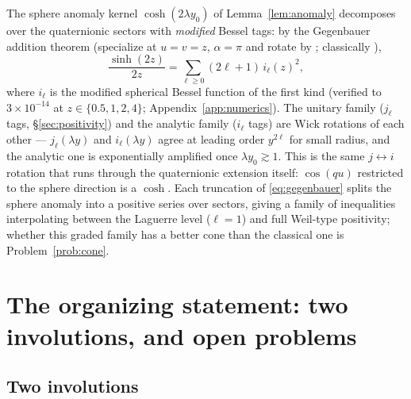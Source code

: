 \documentclass[11pt]{amsart}
\theoremstyle{plain}
\theoremstyle{definition}
\theoremstyle{remark}
\begin{document}
The sphere anomaly kernel $\cosh(2\lambda y_0)$ of Lemma~\ref{lem:anomaly} decomposes over the
quaternionic sectors with \emph{modified} Bessel tags: by the Gegenbauer addition theorem
(specialize \cite[10.60.2]{DLMF} at $u=v=z$, $\alpha=\pi$ and rotate by
\cite[10.47.12]{DLMF}; classically \cite[\S11.4]{Watson1944}),
\begin{equation}\label{eq:gegenbauer}
\frac{\sinh(2z)}{2z}=\sum_{\ell\ge0}(2\ell+1)\,i_\ell(z)^2 ,
\end{equation}
where $i_\ell$ is the modified spherical Bessel function of the first kind (verified to
$3\times10^{-14}$ at $z\in\{0.5,1,2,4\}$; Appendix~\ref{app:numerics}). The unitary family
($j_\ell$ tags, \S\ref{sec:positivity}) and the analytic family ($i_\ell$ tags) are Wick
rotations of each other --- $j_\ell(\lambda y)$ and $i_\ell(\lambda y)$ agree at leading order
$y^{2\ell}$ for small radius, and the analytic one is exponentially amplified once
$\lambda y_0\gtrsim1$. This is the same $j\leftrightarrow i$ rotation that runs through the
quaternionic extension itself: $\cos(qu)$ restricted to the sphere direction is a $\cosh$. Each
truncation of \eqref{eq:gegenbauer} splits the sphere anomaly into a positive series over
sectors, giving a family of inequalities interpolating between the Laguerre level ($\ell=1$) and
full Weil-type positivity; whether this graded family has a better cone than the classical one
is Problem~\ref{prob:cone}.

\section{The organizing statement: two involutions, and open problems}\label{sec:involutions}

\subsection{Two involutions}
\end{document}
